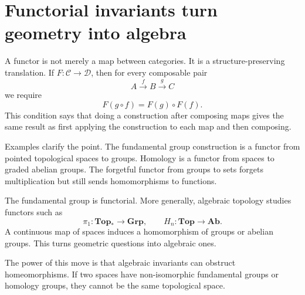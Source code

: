 \section{Functorial invariants turn geometry into algebra}

A functor is not merely a map between categories.  It is a structure-preserving translation.  If \(F:\mathcal C\to\mathcal D\), then for every composable pair
\[
  A\xrightarrow{f}B\xrightarrow{g}C
\]
we require
\[
  F(g\circ f)=F(g)\circ F(f).
\]
This condition says that doing a construction after composing maps gives the same result as first applying the construction to each map and then composing.

Examples clarify the point.  The fundamental group construction is a functor from pointed topological spaces to groups.  Homology is a functor from spaces to graded abelian groups.  The forgetful functor from groups to sets forgets multiplication but still sends homomorphisms to functions.

The fundamental group is functorial.  More generally, algebraic topology studies functors such as
\[
  \pi_1:\mathbf{Top}_*\to\mathbf{Grp},\qquad
  H_n:\mathbf{Top}\to\mathbf{Ab}.
\]
A continuous map of spaces induces a homomorphism of groups or abelian groups.  This turns geometric questions into algebraic ones.

The power of this move is that algebraic invariants can obstruct homeomorphisms.  If two spaces have non-isomorphic fundamental groups or homology groups, they cannot be the same topological space.
